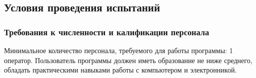 \subsection{Условия проведения испытаний}

\subsubsection{Требования к численности и калификации персонала}
Минимальное количество персонала, требуемого для работы программы: 1 оператор. Пользователь программы должен иметь образование не ниже среднего, обладать практическими навыками работы с компьютером и электронникой.



